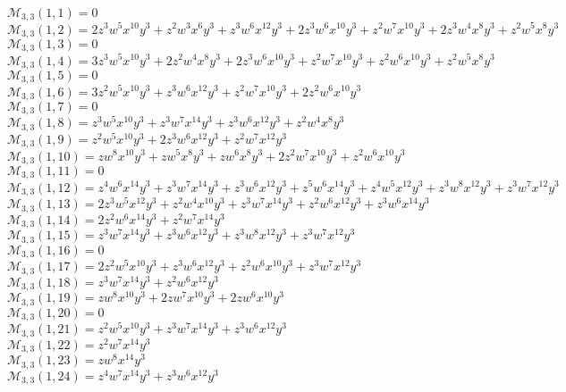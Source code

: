 \documentclass[12pt]{memoireuqam1.3}
\begin{document}
\scriptsize
$\mathcal{M}_{3,3}(1,1)=0$\\
$\mathcal{M}_{3,3}(1,2)=2z^3w^5x^{10}y^3+z^2w^3x^6y^3+z^3w^6x^{12}y^3+2z^3w^6x^10y^3+z^2w^7x^{10}y^3+2z^3w^4x^8y^3+z^2w^5x^8y^3$\\
$\mathcal{M}_{3,3}(1,3)=0$\\
$\mathcal{M}_{3,3}(1,4)=3z^3w^5x^{10}y^3+2z^2w^4x^8y^3+2z^3w^6x^{10}y^3+z^2w^7x^{10}y^3+z^2w^6x^{10}y^3+z^2w^5x^8y^3$\\
$\mathcal{M}_{3,3}(1,5)=0$\\
$\mathcal{M}_{3,3}(1,6)=3z^2w^5x^{10}y^3+z^3w^6x^12y^3+z^2w^7x^{10}y^3+2z^2w^6x^{10}y^3$\\
$\mathcal{M}_{3,3}(1,7)=0$\\
$\mathcal{M}_{3,3}(1,8)=z^3w^5x^{10}y^3+z^3w^7x^{14}y^3+z^3w^6x^{12}y^3+z^2w^4x^8y^3$\\
$\mathcal{M}_{3,3}(1,9)=z^2w^5x^{10}y^3+2z^3w^6x^{12}y^3+z^2w^7x^{12}y^3$\\
$\mathcal{M}_{3,3}(1,10)=zw^8x^{10}y^3+zw^5x^8y^3+zw^6x^8y^3+2z^2w^7x^{10}y^3+z^2w^6x^{10}y^3$\\
$\mathcal{M}_{3,3}(1,11)=0$\\
$\mathcal{M}_{3,3}(1,12)=z^4w^6x^14y^3+z^3w^7x^{14}y^3+z^3w^6x^{12}y^3+z^5w^6x^{14}y^3+z^4w^5x^{12}y^3+z^3w^8x^{12}y^3+z^3w^7x^{12}y^3$\\
$\mathcal{M}_{3,3}(1,13)=2z^3w^5x^{12}y^3+z^2w^4x^{10}y^3+z^3w^7x^{14}y^3+z^2w^6x^{12}y^3+z^3w^6x^{14}y^3$\\
$\mathcal{M}_{3,3}(1,14)=2z^2w^6x^{14}y^3+z^2w^7x^{14}y^3$\\
$\mathcal{M}_{3,3}(1,15)=z^3w^7x^{14}y^3+z^3w^6x^{12}y^3+z^3w^8x^{12}y^3+z^3w^7x^{12}y^3$\\
$\mathcal{M}_{3,3}(1,16)=0$\\
$\mathcal{M}_{3,3}(1,17)=2z^2w^5x^{10}y^3+z^3w^6x^{12}y^3+z^2w^6x^{10}y^3+z^3w^7x^{12}y^3$\\
$\mathcal{M}_{3,3}(1,18)=z^3w^7x^{14}y^3+z^2w^6x^{12}y^3$\\
$\mathcal{M}_{3,3}(1,19)=zw^8x^{10}y^3+2zw^7x^{10}y^3+2zw^6x^{10}y^3$\\
$\mathcal{M}_{3,3}(1,20)=0$\\
$\mathcal{M}_{3,3}(1,21)=z^2w^5x^{10}y^3+z^3w^7x^{14}y^3+z^3w^6x^{12}y^3$\\
$\mathcal{M}_{3,3}(1,22)=z^2w^7x^{14}y^3$\\
$\mathcal{M}_{3,3}(1,23)=zw^8x^{14}y^3$\\
$\mathcal{M}_{3,3}(1,24)=z^4w^7x^{14}y^3+z^3w^6x^{12}y^3$\\
\end{document}
